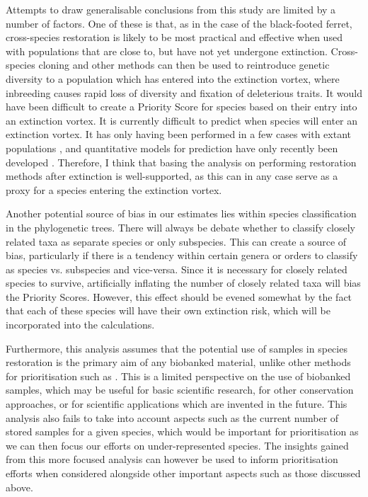 \documentclass[12pt]{article}
\begin{document}
	Attempts to draw generalisable conclusions from this study are limited by a
	number of factors. One of these is that, as in the case of the black-footed
	ferret, cross-species restoration is likely to be most practical and
	effective when used with populations that are close to, but have not yet
	undergone extinction. Cross-species cloning and other methods can then be
	used to reintroduce genetic diversity to a population which has entered into
	the extinction vortex, where inbreeding causes rapid loss of diversity and
	fixation of deleterious traits. It would have been difficult to create a
	Priority Score for species based on their entry into an extinction vortex.
	It is currently difficult to predict when species
	will enter an extinction vortex. It has only having been performed in a few cases
	with extant populations \citep{williamsextinctionvortex2020}, and quantitative
	models for prediction have only recently been developed
	\citep{nabutanyiModelsEcoEvolutionaryExtinction2021}. Therefore, I think that
	basing the analysis on performing restoration methods after extinction
	is well-supported, as
	this can in any case serve as a proxy for a species entering the extinction
	vortex.
	
	Another potential source of bias in our estimates lies within species
	classification in the phylogenetic trees. There will always be debate whether
	to classify closely related taxa as separate species or only subspecies. This
	can create a source of bias, particularly if there is a tendency within certain
	genera or orders to classify as species vs. subspecies and vice-versa. Since it
	is necessary for closely related species to survive, artificially inflating the
	number of closely related taxa will bias the Priority Scores. However, this
	effect should be evened somewhat by the fact that each of these species will 
	have their own extinction risk, which will be incorporated into the
	calculations.
	
	Furthermore, this analysis assumes that the potential use of samples in species
	restoration is the primary aim of any biobanked material, unlike other
	methods for prioritisation such as
	\citep{harwoodDevelopingImplementingPrioritisation2021,mooneyValueExSitu2021}.
	This is a limited perspective on the use of biobanked samples, which may be
	useful for basic scientific research, for other conservation approaches, or
	for scientific applications which are invented in the future. This
	analysis also fails to take into account aspects such as the current number
	of stored samples for a given species, which would be important for
	prioritisation as we can then focus our efforts on under-represented species.
	The insights gained from this more focused analysis can however be used
	to inform prioritisation efforts when considered alongside other important
	aspects such as those discussed above.
	
\end{document}
